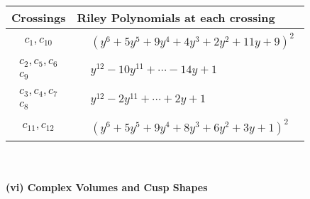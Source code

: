 \documentclass[1p]{elsarticle_modified}
\theoremstyle{definition}
\begin{document}
\begin{tabular}{m{50pt}|m{274pt}}
Crossings & \hspace{64pt}Riley Polynomials at each crossing \\
\hline $$\begin{aligned}c_{1},c_{10}\end{aligned}$$&$\begin{aligned}
&(y^6+5 y^5+9 y^4+4 y^3+2 y^2+11 y+9)^2
\end{aligned}$\\
\hline $$\begin{aligned}c_{2},c_{5},c_{6}\\c_{9}\end{aligned}$$&$\begin{aligned}
&y^{12}-10 y^{11}+\cdots-14 y+1
\end{aligned}$\\
\hline $$\begin{aligned}c_{3},c_{4},c_{7}\\c_{8}\end{aligned}$$&$\begin{aligned}
&y^{12}-2 y^{11}+\cdots+2 y+1
\end{aligned}$\\
\hline $$\begin{aligned}c_{11},c_{12}\end{aligned}$$&$\begin{aligned}
&(y^6+5 y^5+9 y^4+8 y^3+6 y^2+3 y+1)^2
\end{aligned}$\\
\hline
\end{tabular}\\~\\
\newpage\flushleft \textbf{(vi) Complex Volumes and Cusp Shapes}
\end{document}
